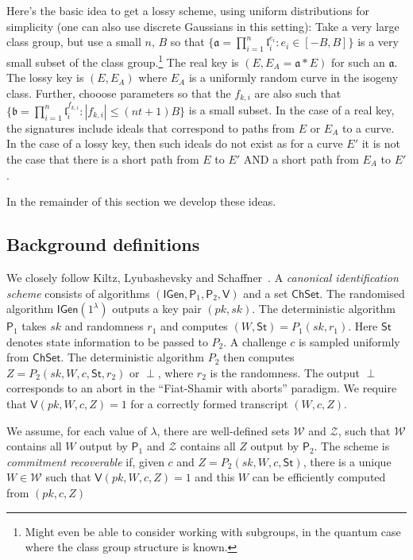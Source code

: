 \documentclass{llncs}
\renewcommand{\a}{\mathfrak{a}}
\renewcommand{\b}{\mathfrak{b}}
\renewcommand{\l}{\mathfrak{l}}
\newcommand{\IGen}{\mathsf{IGen}}
\newcommand{\PP}{\mathsf{P}}
\newcommand{\VV}{\mathsf{V}}
\newcommand{\Wset}{\mathcal{W}}
\newcommand{\Zset}{\mathcal{Z}}
\newcommand{\ChSet}{\textsf{ChSet}}
\newcommand{\St}{\textsf{St}}
\begin{document}
Here's the basic idea to get a lossy scheme, using uniform distributions for simplicity (one can also use discrete Gaussians in this setting):
Take a very large class group, but use a small $n$, $B$ so that $\{ \a = \prod_{i=1}^n \l_i^{e_i} : e_i \in [-B,B] \}$ is a very small subset of the class group.\footnote{Might even be able to consider working with subgroups, in the quantum case where the class group structure is known.}
The real key is $(E, E_A = \a*E )$ for such an $\a$.
The lossy key is $(E, E_A )$ where $E_A$ is a uniformly random curve in the isogeny class.
Further, chooose parameters so that the $f_{k,i}$ are also such that $\{ \b = \prod_{i=1}^n \l_i^{f_{k,i}} : |f_{k,i}| \le (nt+1)B \}$ is a small subset.
In the case of a real key, the signatures include ideals that correspond to paths from $E$ or $E_A$ to a  curve.
In the case of a lossy key, then such ideals do not exist as for a curve $E'$ it is not the case that there is a short path from $E$ to $E'$ AND a short path from $E_A$ to $E'$.

In the remainder of this section we develop these ideas.


\subsection{Background definitions} \label{sec:KLS-defns}

We closely follow Kiltz, Lyubashevsky and Schaffner~\cite{KLS18}.
A \emph{canonical identification scheme} consists of algorithms $(\IGen, \PP_1, \PP_2, \VV)$ and a set $\ChSet$. The randomised algorithm $\IGen( 1^\lambda )$ outputs a key pair $(pk,sk)$.
The deterministic algorithm $\PP_1$ takes $sk$ and randomness $r_1$ and computes $(W, \St) = P_1( sk, r_1 )$. 
Here $\St$ denotes state information to be passed to $P_2$.
A challenge $c$ is sampled uniformly from $\ChSet$. The deterministic algorithm $P_2$ then computes $Z = P_2( sk, W, c, \St, r_2 )$ or $\perp$, where $r_2$ is the randomness.
The output $\perp$ corresponds to an abort in the ``Fiat-Shamir with aborts'' paradigm.
We require that $\VV( pk, W, c, Z ) = 1$ for a correctly formed transcript $(W,c,Z)$.

We assume, for each value of $\lambda$, there are well-defined sets $\Wset$ and $\Zset$, such that $\Wset$ contains all $W$ output by $\PP_1$ and $\Zset$ contains all $Z$ output by $\PP_2$. 
The scheme is \emph{commitment recoverable} if, given $c$ and $Z = P_2( sk, W, c, \St )$, there is a unique $W \in \Wset$ such that $\VV( pk, W, c, Z ) = 1$ and this $W$ can be efficiently computed from $(pk, c, Z)$
\end{document}
